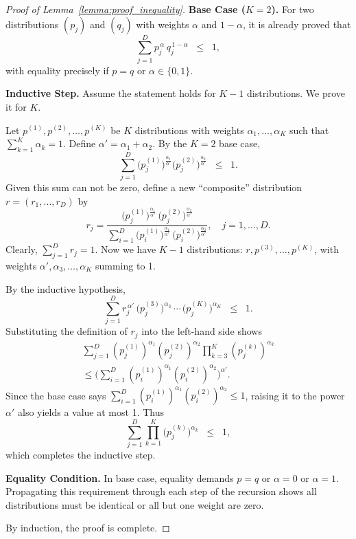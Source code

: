 \documentclass[10pt,a4paper]{amsart}
\begin{document}
\begin{proof}[Proof of Lemma~\ref{lemma:proof_inequality}]

\textbf{Base Case ($K=2$).} 
For two distributions $(p_j)$ and $(q_j)$ with weights $\alpha$ and $1-\alpha$, 
it is already proved that
\[
\sum_{j=1}^D p_j^{\,\alpha} \, q_j^{\,1-\alpha} \;\;\le\;\; 1,
\]
with equality precisely if $p=q$ or $\alpha \in \{0,1\}$.

\textbf{Inductive Step.} 
Assume the statement holds for $K-1$ distributions. We prove it for $K$.

Let $p^{(1)}, p^{(2)}, \dots, p^{(K)}$ be $K$ distributions with weights 
$\alpha_1,\dots,\alpha_K$ such that $\sum_{k=1}^K \alpha_k = 1$. 
Define $\alpha' = \alpha_1 + \alpha_2$. 
By the $K=2$ base case,
\[
\sum_{j=1}^D 
\bigl(p^{(1)}_j\bigr)^{\frac{\alpha_1}{\alpha'}}
\bigl(p^{(2)}_j\bigr)^{\frac{\alpha_2}{\alpha'}}
\;\;\le\;\; 1.
\]
Given this sum can not be zero, define a new ``composite'' distribution 
$r = (r_1,\dots,r_D)$ by
\[
r_j 
= 
\frac{
 \bigl(p^{(1)}_j\bigr)^{\frac{\alpha_1}{\alpha'}}\,\bigl(p^{(2)}_j\bigr)^{\frac{\alpha_2}{\alpha'}}
}{
 \sum_{i=1}^D 
 \bigl(p^{(1)}_i\bigr)^{\frac{\alpha_1}{\alpha'}}\,\bigl(p^{(2)}_i\bigr)^{\frac{\alpha_2}{\alpha'}}
},
\quad
j=1,\dots,D.
\]
Clearly, $\sum_{j=1}^D r_j = 1$. 
Now we have $K-1$ distributions: $r, p^{(3)}, \dots, p^{(K)}$, 
with weights $\alpha',\alpha_3,\dots,\alpha_K$ summing to 1.

By the inductive hypothesis, 
\[
\sum_{j=1}^D
r_j^{\,\alpha'}
\,\bigl(p^{(3)}_j\bigr)^{\alpha_3}
\,\cdots\,
\bigl(p^{(K)}_j\bigr)^{\alpha_K}
\;\;\le\;\; 1.
\]
Substituting the definition of $r_j$ into the left-hand side shows
\begin{multline}
\sum_{j=1}^D
  (p^{(1)}_j)^{\alpha_1}(p^{(2)}_j)^{\alpha_2}
  \prod_{k=3}^K (p^{(k)}_j)^{\alpha_k} \\
\le
\Biggl(
  \sum_{i=1}^D
    (p^{(1)}_i)^{\alpha_1}(p^{(2)}_i)^{\alpha_2}
\Biggr)^{\alpha'}.
\end{multline}
Since the base case says $\sum_{i=1}^D (p^{(1)}_i)^{\alpha_1} (p^{(2)}_i)^{\alpha_2} 
\le 1$, 
raising it to the power $\alpha'$ also yields a value at most 1. Thus
\[
\sum_{j=1}^D
\prod_{k=1}^K \bigl(p^{(k)}_j\bigr)^{\alpha_k}
\;\;\le\;\; 1,
\]
which completes the inductive step.

\textbf{Equality Condition.} 
In base case, equality demands $p=q$ or 
$\alpha=0 $ or $\alpha = 1$. Propagating this requirement through 
each step of the recursion shows all distributions must be identical 
or all but one weight are zero. 

By induction, the proof is complete.
\end{proof}
\end{document}
